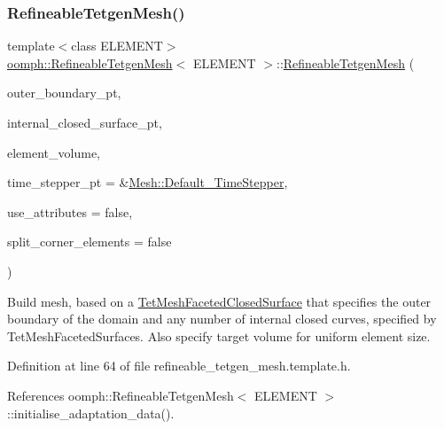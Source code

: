 \subsubsection{\texorpdfstring{Refineable\+Tetgen\+Mesh()}{RefineableTetgenMesh()}\hspace{0.1cm}{\footnotesize\ttfamily [1/2]}}
{\footnotesize\ttfamily template$<$class E\+L\+E\+M\+E\+NT$>$ \\
\hyperlink{classoomph_1_1RefineableTetgenMesh}{oomph\+::\+Refineable\+Tetgen\+Mesh}$<$ E\+L\+E\+M\+E\+NT $>$\+::\hyperlink{classoomph_1_1RefineableTetgenMesh}{Refineable\+Tetgen\+Mesh} (\begin{DoxyParamCaption}\item[{\hyperlink{classoomph_1_1TetMeshFacetedClosedSurface}{Tet\+Mesh\+Faceted\+Closed\+Surface} $\ast$const \&}]{outer\+\_\+boundary\+\_\+pt,  }\item[{\hyperlink{classoomph_1_1Vector}{Vector}$<$ \hyperlink{classoomph_1_1TetMeshFacetedSurface}{Tet\+Mesh\+Faceted\+Surface} $\ast$$>$ \&}]{internal\+\_\+closed\+\_\+surface\+\_\+pt,  }\item[{const double \&}]{element\+\_\+volume,  }\item[{\hyperlink{classoomph_1_1TimeStepper}{Time\+Stepper} $\ast$}]{time\+\_\+stepper\+\_\+pt = {\ttfamily \&\hyperlink{classoomph_1_1Mesh_a12243d0fee2b1fcee729ee5a4777ea10}{Mesh\+::\+Default\+\_\+\+Time\+Stepper}},  }\item[{const bool \&}]{use\+\_\+attributes = {\ttfamily false},  }\item[{const bool \&}]{split\+\_\+corner\+\_\+elements = {\ttfamily false} }\end{DoxyParamCaption})\hspace{0.3cm}{\ttfamily [inline]}}



Build mesh, based on a \hyperlink{classoomph_1_1TetMeshFacetedClosedSurface}{Tet\+Mesh\+Faceted\+Closed\+Surface} that specifies the outer boundary of the domain and any number of internal closed curves, specified by Tet\+Mesh\+Faceted\+Surfaces. Also specify target volume for uniform element size. 



Definition at line 64 of file refineable\+\_\+tetgen\+\_\+mesh.\+template.\+h.



References oomph\+::\+Refineable\+Tetgen\+Mesh$<$ E\+L\+E\+M\+E\+N\+T $>$\+::initialise\+\_\+adaptation\+\_\+data().

\mbox{\label{classoomph_1_1RefineableTetgenMesh_ab1c379c483f5f2a025a68683fbada666}} 
